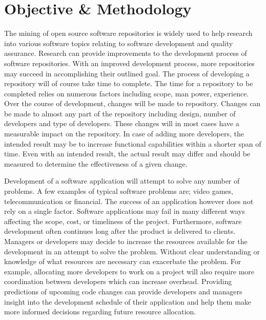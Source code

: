 
\section{Objective \& Methodology}

The mining of open source software repositories is widely used to help research into various software topics relating to software development and quality assurance. Research can provide improvements to the development process of software repositories. With an improved development process, more repositories may succeed in accomplishing their outlined goal. The process of developing a repository will of course take time to complete. The time for a repository to be completed relies on numerous factors including scope, man power, experience. Over the course of development, changes will be made to repository. Changes can be made to almost any part of the repository including design, number of developers and type of developers. These changes will in most cases have a measurable impact on the repository. In case of adding more developers, the intended result may be to increase functional capabilities within a shorter span of time. Even with an intended result, the actual result may differ and should be measured to determine the effectiveness of a given change.

Development of a software application will attempt to solve any number of problems. A few examples of typical software problems are; video games, telecommunication or financial. The success of an application however does not rely on a single factor. Software applications may fail in many different ways affecting the scope, cost, or timeliness of the project. Furthermore, software development often continues long after the product is delivered to clients. Managers or developers may decide to increase the resources available for the development in an attempt to solve the problem. Without clear understanding or knowledge of what resources are necessary can exacerbate the problem. For example, allocating more developers to work on a project will also require more coordination between developers which can increase overhead. Providing  predictions of upcoming code changes can provide developers and managers insight into the development schedule of their application and help them make more informed decisions regarding future resource allocation.


